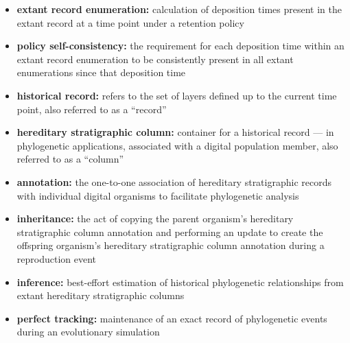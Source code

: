 \begin{itemize}
  \item \textbf{extant record enumeration:} calculation of deposition times present in the extant record at a time point under a retention policy
  \item \textbf{policy self-consistency:} the requirement for each deposition time within an extant record enumeration to be consistently present in all extant enumerations since that deposition time
  \item \textbf{historical record:} refers to the set of layers defined up to the current time point, also referred to as a ``record''
  \item \textbf{hereditary stratigraphic column:} container for a historical record --- in phylogenetic applications, associated with a digital population member, also referred to as a ``column''
  \item \textbf{annotation:} the one-to-one association of hereditary stratigraphic records with individual digital organisms to facilitate phylogenetic analysis
  \item \textbf{inheritance:} the act of copying the parent organism's hereditary stratigraphic column annotation and performing an update to create the offspring organism's hereditary stratigraphic column annotation during a reproduction event
  \item \textbf{inference:} best-effort estimation of historical phylogenetic relationships from extant hereditary stratigraphic columns
  \item \textbf{perfect tracking:} maintenance of an exact record of phylogenetic events during an evolutionary simulation
\end{itemize}

